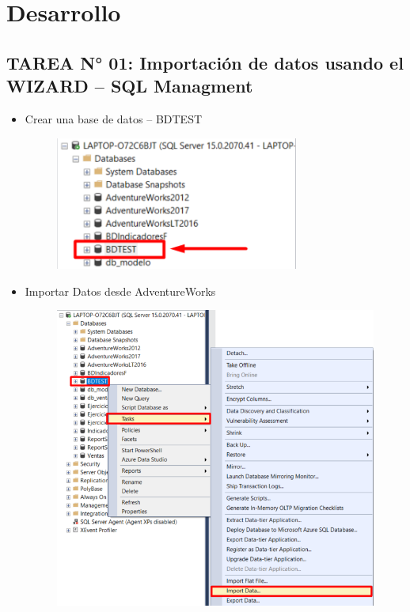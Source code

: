 \documentclass[12pt,letterpaper]{article}
\begin{document}
\newpage

\section{Desarrollo}


\subsection{TAREA N° 01: Importación de datos usando el WIZARD – SQL Managment}

\begin{itemize}
\item Crear una base de datos – BDTEST
	\begin{figure}[htb]
		\begin{center}
			\includegraphics[width=8cm]{./IMAGENES/Tarea1_1}
			
		\end{center}
	\end{figure}
\item Importar Datos desde AdventureWorks
	\begin{figure}[htb]
		\begin{center}
			\includegraphics[width=13cm]{./IMAGENES/Tarea1_2}
			

\end{center}
\end{figure}
\end{itemize}
\end{document}
